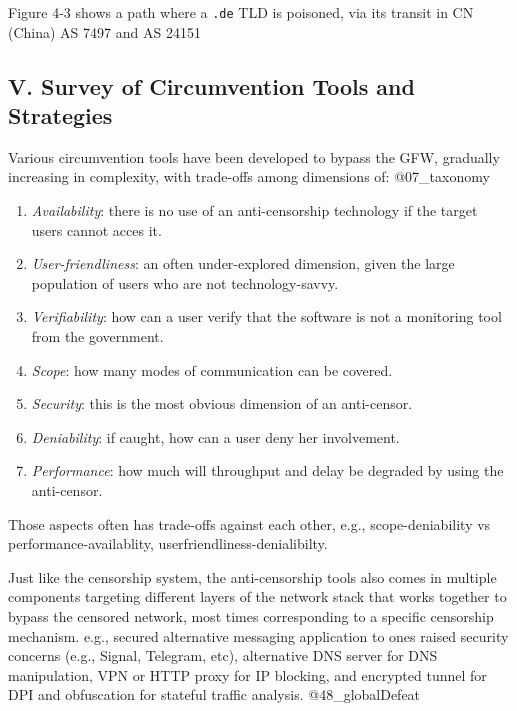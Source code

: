 Figure 4-3 shows a path where a \texttt{.de} TLD is poisoned, via its
transit in CN (China) AS 7497 and AS 24151

\hypertarget{v.-survey-of-circumvention-tools-and-strategies}{%
\subsection{V. Survey of Circumvention Tools and
Strategies}\label{v.-survey-of-circumvention-tools-and-strategies}}

Various circumvention tools have been developed to bypass the GFW,
gradually increasing in complexity, with trade-offs among dimensions of:
@07\_taxonomy

\begin{enumerate}
\def\labelenumi{\arabic{enumi}.}
\item
  \emph{Availability}: there is no use of an anti-censorship technology
  if the target users cannot acces it.
\item
  \emph{User-friendliness}: an often under-explored dimension, given the
  large population of users who are not technology-savvy.
\item
  \emph{Verifiability}: how can a user verify that the software is not a
  monitoring tool from the government.
\item
  \emph{Scope}: how many modes of communication can be covered.
\item
  \emph{Security}: this is the most obvious dimension of an anti-censor.
\item
  \emph{Deniability}: if caught, how can a user deny her involvement.
\item
  \emph{Performance}: how much will throughput and delay be degraded by
  using the anti-censor.
\end{enumerate}

Those aspects often has trade-offs against each other, e.g.,
scope-deniability vs performance-availablity,
userfriendliness-denialibilty.

Just like the censorship system, the anti-censorship tools also comes in
multiple components targeting different layers of the network stack that
works together to bypass the censored network, most times corresponding
to a specific censorship mechanism. e.g., secured alternative messaging
application to ones raised security concerns (e.g., Signal, Telegram,
etc), alternative DNS server for DNS manipulation, VPN or HTTP proxy for
IP blocking, and encrypted tunnel for DPI and obfuscation for stateful
traffic analysis. @48\_globalDefeat

